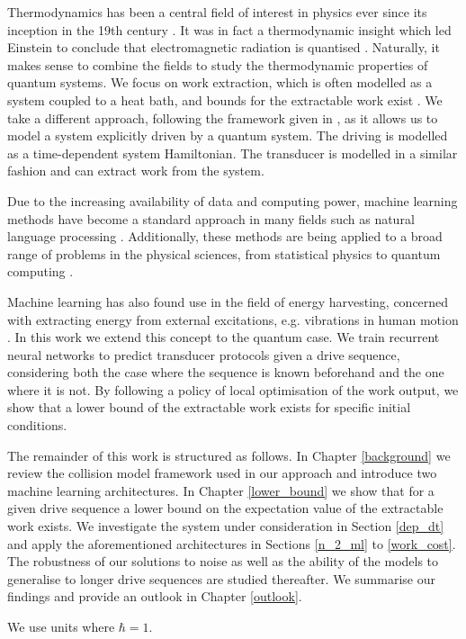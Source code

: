 Thermodynamics has been a central field of interest in physics ever since its inception in the 19th century \cite{thomson_2011}.
It was in fact a thermodynamic insight which led Einstein to conclude that electromagnetic radiation is quantised \cite{1905AnP...322..132E}.
Naturally, it makes sense to combine the fields to study the thermodynamic properties of quantum systems.
We focus on work extraction, which is often modelled as a system coupled to a heat bath, and bounds for the extractable work exist \cite{Egloff_2015}.
We take a different approach, following the framework given in \cite{beyer2020}, as it allows us to model a system explicitly driven by a quantum system.
The driving is modelled as a time-dependent system Hamiltonian.
The transducer is modelled in a similar fashion and can extract work from the system.

Due to the increasing availability of data and computing power, machine learning methods have become a standard approach in many fields such as natural language processing \cite{DBLP:journals/corr/VaswaniSPUJGKP17}.
Additionally, these methods are being applied to a broad range of problems in the physical sciences, from statistical physics to quantum computing \cite{Carleo_2019, wise2021using}.

Machine learning has also found use in the field of energy harvesting, concerned with extracting energy from external excitations, e.g. vibrations in human motion \cite{Liu2019}.
In this work we extend this concept to the quantum case.
We train recurrent neural networks to predict transducer protocols given a drive sequence, considering both the case where the sequence is known beforehand and the one where it is not.
By following a policy of local optimisation of the work output, we show that a lower bound of the extractable work exists for specific initial conditions.

The remainder of this work is structured as follows.
In Chapter \ref{background} we review the collision model framework used in our approach and introduce two machine learning architectures.
In Chapter \ref{lower_bound} we show that for a given drive sequence a lower bound on the expectation value of the extractable work exists.
We investigate the system under consideration in Section \ref{dep_dt} and apply the aforementioned architectures in Sections \ref{n_2_ml} to \ref{work_cost}.
The robustness of our solutions to noise as well as the ability of the models to generalise to longer drive sequences are studied thereafter.
We summarise our findings and provide an outlook in Chapter \ref{outlook}.

We use units where $\hbar = 1$.